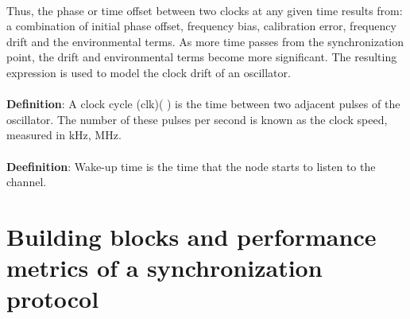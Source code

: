 \documentclass[a4paper,10pt]{report}
\begin{document}
\paragraph*{}
Thus, the phase or time offset between two clocks at any given time results from: a
combination of initial phase offset, frequency bias, calibration
error, frequency drift and the environmental terms. As more time
passes from the synchronization point, the drift and environmental
terms become more significant. The resulting expression is used to
model the clock drift of an oscillator.\paragraph*{}
\textbf{Definition}: A clock cycle (clk)( )
is the time between two adjacent pulses of the oscillator. The
number of these pulses per second is known as the clock speed,
measured in kHz, MHz.\paragraph*{}
\textbf{Deefinition}: Wake-up time  is the time that the node starts to listen to the channel.
\section{\textbf{Building blocks and performance metrics of a synchronization protocol}}
\end{document}
